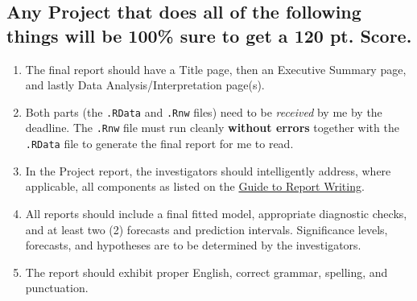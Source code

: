 \documentclass[10pt]{article}
\begin{document}
\subsection*{Any Project that does all of the following things will be 100\% sure to get a 120 pt. Score.}
\label{sec-1-2}


\begin{enumerate}
\item The final report should have a Title page, then an Executive Summary page, and lastly Data Analysis/Interpretation page(s).
\item Both parts (the \texttt{.RData} and \texttt{.Rnw} files) need to be \emph{received} by me by the deadline.  The \texttt{.Rnw} file must run cleanly \textbf{without errors} together with the \texttt{.RData} file to generate the final report for me to read.
\item In the Project report, the investigators should intelligently address, where applicable, all components as listed on the \underline{Guide to Report Writing}.
\item All reports should include a final fitted model, appropriate diagnostic checks, and at least two (2) forecasts and prediction intervals. Significance levels, forecasts, and hypotheses are to be determined by the investigators.
\item The report should exhibit proper English, correct grammar, spelling, and punctuation.
\end{enumerate}
\end{document}
